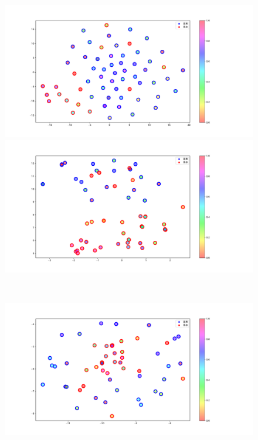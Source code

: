 \begin{figure}[h]
 \begin{minipage}[b]{0.48\linewidth}
  \centering
  \includegraphics[scale=0.15]{./imgs/tSNE/sofa_1.pdf}
 \end{minipage}
 \begin{minipage}[b]{0.48\linewidth}
  \centering
  \includegraphics[scale=0.15]{./imgs/tSNE/sofa_2.pdf}
 \end{minipage}\\
 \begin{minipage}[b]{0.48\linewidth}
  \centering
  \includegraphics[scale=0.15]{./imgs/tSNE/sofa_3.pdf}

\end{minipage}
\end{figure}
